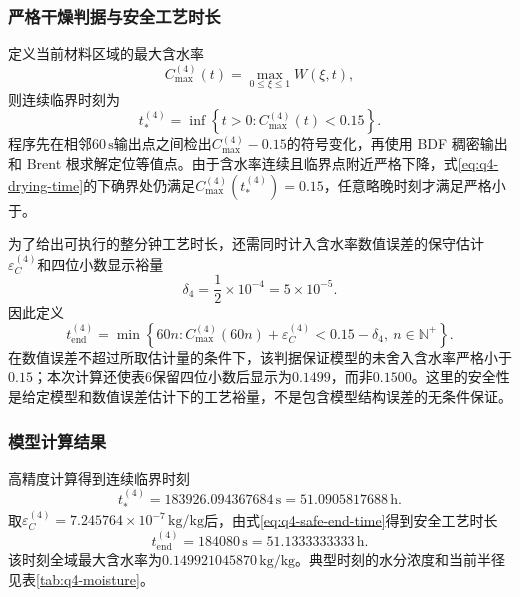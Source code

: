 \documentclass[withoutpreface,bwprint]{cumcmthesis}
\begin{document}
\subsubsection{严格干燥判据与安全工艺时长}

定义当前材料区域的最大含水率
\begin{equation}
C_{\max}^{(4)}(t)=\max_{0\le\xi\le1}W(\xi,t),
\label{eq:q4-global-maximum}
\end{equation}
则连续临界时刻为
\begin{equation}
\boxed{
t_*^{(4)}
=\inf\left\{t>0:C_{\max}^{(4)}(t)<0.15\right\}.
}
\label{eq:q4-drying-time}
\end{equation}
程序先在相邻$60\,\mathrm s$输出点之间检出$C_{\max}^{(4)}-0.15$的符号变化，再使用 BDF 稠密输出和 Brent 根求解定位等值点。由于含水率连续且临界点附近严格下降，式\eqref{eq:q4-drying-time}的下确界处仍满足$C_{\max}^{(4)}(t_*^{(4)})=0.15$，任意略晚时刻才满足严格小于。

为了给出可执行的整分钟工艺时长，还需同时计入含水率数值误差的保守估计$\varepsilon_C^{(4)}$和四位小数显示裕量
\begin{equation}
\delta_4=\frac{1}{2}\times10^{-4}=5\times10^{-5}.
\label{eq:q4-display-margin}
\end{equation}
因此定义
\begin{equation}
\boxed{
t_{\mathrm{end}}^{(4)}
=\min\left\{
60n:
C_{\max}^{(4)}(60n)+\varepsilon_C^{(4)}
<0.15-\delta_4,
\ n\in\mathbb N^+
\right\}.
}
\label{eq:q4-safe-end-time}
\end{equation}
在数值误差不超过所取估计量的条件下，该判据保证模型的未舍入含水率严格小于$0.15$；本次计算还使表6保留四位小数后显示为$0.1499$，而非$0.1500$。这里的安全性是给定模型和数值误差估计下的工艺裕量，不是包含模型结构误差的无条件保证。

\subsubsection{模型计算结果}

高精度计算得到连续临界时刻
\begin{equation}
\boxed{
t_*^{(4)}
=183926.094367684\,\mathrm s
=51.0905817688\,\mathrm h.
}
\label{eq:q4-final-crossing}
\end{equation}
取$\varepsilon_C^{(4)}=7.245764\times10^{-7}\,\mathrm{kg/kg}$后，由式\eqref{eq:q4-safe-end-time}得到安全工艺时长
\begin{equation}
\boxed{
t_{\mathrm{end}}^{(4)}
=184080\,\mathrm s
=51.1333333333\,\mathrm h.
}
\label{eq:q4-final-safe-time}
\end{equation}
该时刻全域最大含水率为$0.149921045870\,\mathrm{kg/kg}$。典型时刻的水分浓度和当前半径见表\ref{tab:q4-moisture}。
\end{document}
